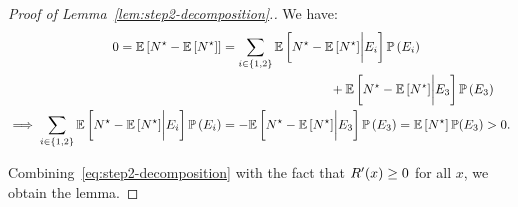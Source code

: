 \documentclass[12pt]{article}
\begin{document}
\begin{proof}[Proof of Lemma~\ref{lem:step2-decomposition}.]
We have:
\begin{align}\label{eq:step2-decomposition}
    0 = \EE\left[\randomstate^\star-\EEn\right] &= \sum_{i\in\{1,2\}}\EE\left[{\randomstate^\star-\EEn}\bigg{|}E_i\right]\PP\left(E_i\right) \notag
    \\ &\hspace{3cm}+ \EE\left[{\randomstate^\star-\EEn}\bigg{|}E_3\right]\PP\left(E_3\right) \notag \\
    \implies  \sum_{i\in\{1,2\}}\EE\left[{\randomstate^\star-\EEn}\bigg{|}E_i\right]\PP\left(E_i\right) &= -\EE\left[{\randomstate^\star-\EEn}\bigg{|}E_3\right]\PP\left(E_3\right) = \EEn\PP(E_3) > 0.
\end{align} 

Combining~\eqref{eq:step2-decomposition} with the fact that $R'(x) \geq 0$ for all $x$, we obtain the lemma. 
\end{proof}
\end{document}
